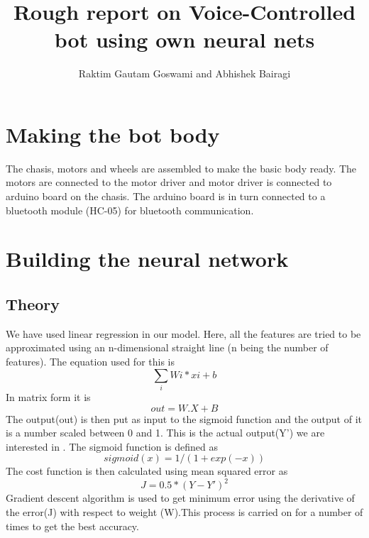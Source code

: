 \documentclass[a4paper,12pt]{article}
\begin{document}
\title{\textbf{Rough report on Voice-Controlled bot using own neural nets}}
\author{Raktim Gautam Goswami and Abhishek Bairagi}
\maketitle


\section{Making the bot body}
The chasis, motors and wheels are assembled to make the basic body ready. The motors are connected to the motor driver and motor driver is connected to arduino board on the chasis. The arduino board is in turn connected to a bluetooth module (HC-05) for bluetooth communication.

\section{Building the neural network}
\subsection{Theory}
We have used linear regression in our model. Here, all the features are tried to be approximated using an n-dimensional straight line (n being the number of features). The equation used for this is 
\begin{equation}
\sum_{i} Wi*xi + b
\end{equation}
In matrix form it is $$ out = W.X + B $$ The output(out) is then put as input to the sigmoid function and the output of it is a number scaled between 0 and 1. This is the actual output(Y') we are interested in .  The sigmoid function is defined as $$sigmoid(x) = 1/(1+exp(-x))$$ The cost function is then calculated using mean squared error as $$ J = 0.5*(Y - Y')^2$$ Gradient descent algorithm is used to get minimum error using the derivative of the error(J) with respect to weight (W).This process is carried on for a number of times to get the best accuracy.
\end{document}
